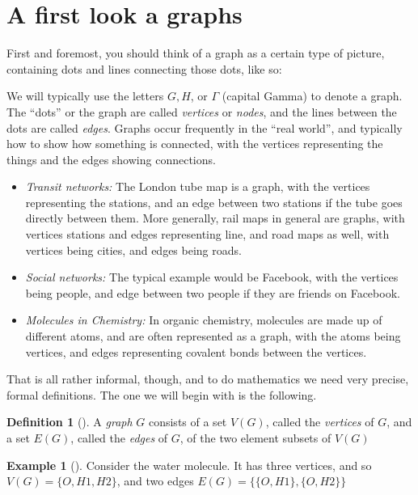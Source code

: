 \documentclass[10pt,]{book}
\theoremstyle{plain}
\theoremstyle{definition}
\newtheorem{definition}[theorem]{Definition}
\theoremstyle{definition}
\newtheorem{example}[theorem]{Example}
\begin{document}
\section[{A first look a graphs}]{A first look a graphs}\label{s_intro_firstlook}
\hypertarget{p-3}{}%
First and foremost, you should think of a graph as a certain type of picture, containing dots and lines connecting those dots, like so:%
\par
\hypertarget{p-4}{}%
We will typically use the letters \(G, H\), or \(\Gamma\) (capital Gamma) to denote a graph.  The ``dots'' or the graph are called \emph{vertices} or \emph{nodes}, and the lines between the dots are called \emph{edges}. Graphs occur frequently in the ``real world'', and typically how to show how something is connected, with the vertices representing the things and the edges showing connections.  \leavevmode%
\begin{itemize}[label=\textbullet]
\item{}\emph{Transit networks:} The London tube map is a graph, with the vertices representing the stations, and an edge between two stations if the tube goes directly between them.  More generally, rail maps in general are graphs, with vertices stations and edges representing line, and road maps as well, with vertices being cities, and edges being roads.%
\item{}\emph{Social networks:} The typical example would be Facebook, with the vertices being people, and edge between two people if they are friends on Facebook.%
\item{}\emph{Molecules in Chemistry:} In organic chemistry, molecules are made up of different atoms, and are often represented as a graph, with the atoms being vertices, and edges representing covalent bonds between the vertices.%
\end{itemize}
%
\par
\hypertarget{p-5}{}%
That is all rather informal, though, and to do mathematics we need very precise, formal definitions.  The one we will begin with is the following.%
\begin{definition}[{}]\label{definition-1}
\hypertarget{p-6}{}%
A \emph{graph} \(G\) consists of a set \(V(G)\), called the \emph{vertices} of \(G\), and a set \(E(G)\), called the \emph{edges} of \(G\), of the two element subsets of \(V(G)\)%
\end{definition}
\begin{example}[]\label{example-1}
\hypertarget{p-7}{}%
Consider the water molecule.  It has three vertices, and so \(V(G)=\{O, H1, H2\}\), and two edges \(E(G)=\big\{\{O, H1\},\{O,H2\}\big\}\)%
\end{example}
\end{document}
